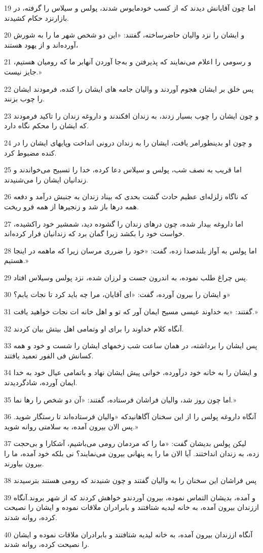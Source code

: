 \par 19 اما چون آقایانش دیدند که از کسب خودمایوس شدند، پولس و سیلاس را گرفته، در بازارنزد حکام کشیدند.
\par 20 و ایشان را نزد والیان حاضرساخته، گفتند: «این دو شخص شهر ما را به شورش آورده‌اند و از یهود هستند،
\par 21 و رسومی را اعلام می‌نمایند که پذیرفتن و به‌جا آوردن آنهابر ما که رومیان هستیم، جایز نیست.»
\par 22 پس خلق بر ایشان هجوم آوردند و والیان جامه های ایشان را کنده، فرمودند ایشان را چوب بزنند.
\par 23 و چون ایشان را چوب بسیار زدند، به زندان افکندند و داروغه زندان را تاکید فرمودند که ایشان را محکم نگاه دارد.
\par 24 و چون او بدینطورامر یافت، ایشان را به زندان درونی انداخت وپایهای ایشان را در کنده مضبوط کرد.
\par 25 اما قریب به نصف شب، پولس و سیلاس دعا کرده، خدا را تسبیح می‌خواندند و زندانیان ایشان را می‌شنیدند.
\par 26 که ناگاه زلزله‌ای عظیم حادث گشت بحدی که بیناد زندان به جنبش درآمد و دفعه همه درها باز شد و زنجیرها از همه فرو ریخت.
\par 27 اما داروغه بیدار شده، چون درهای زندان را گشوده دید، شمشیر خود راکشیده، خواست خود را بکشد زیرا گمان برد که زندانیان فرار کرده‌اند.
\par 28 اما پولس به آواز بلندصدا زده، گفت: «خود را ضرری مرسان زیرا که ماهمه در اینجا هستیم.»
\par 29 پس چراغ طلب نموده، به اندرون جست و لرزان شده، نزد پولس وسیلاس افتاد.
\par 30 و ایشان را بیرون آورده، گفت: «ای آقایان، مرا چه باید کرد تا نجات یابم؟»
\par 31 گفتند: «به خداوند عیسی مسیح ایمان آور که تو و اهل خانه ات نجات خواهید یافت.»
\par 32 آنگاه کلام خداوند را برای او وتمامی اهل بیتش بیان کردند.
\par 33 پس ایشان را برداشته، در همان ساعت شب زخمهای ایشان را شست و خود و همه کسانش فی الفور تعمید یافتند.
\par 34 و ایشان را به خانه خود درآورده، خوانی پیش ایشان نهاد و باتمامی عیال خود به خدا ایمان آورده، شادگردیدند.
\par 35 اما چون روز شد، والیان فراشان فرستاده، گفتند: «آن دو شخص را رها نما.»
\par 36 آنگاه داروغه پولس را از این سخنان آگاهانیدکه «والیان فرستاده‌اند تا رستگار شوید. پس الان بیرون آمده، به سلامتی روانه شوید.»
\par 37 لیکن پولس بدیشان گفت: «ما را که مردمان رومی می‌باشیم، آشکارا و بی‌حجت زده، به زندان انداختند. آیا الان ما را به پنهانی بیرون می‌نمایند؟ نی بلکه خود آمده، ما را بیرون بیاورند.
\par 38 پس فراشان این سخنان را به والیان گفتند و چون شنیدند که رومی هستند بترسیدند
\par 39 و آمده، بدیشان التماس نموده، بیرون آوردندو خواهش کردند که از شهر بروند.آنگاه اززندان بیرون آمده، به خانه لیدیه شتافتند و بابرادران ملاقات نموده و ایشان را نصیحت کرده، روانه شدند.
\par 40 آنگاه اززندان بیرون آمده، به خانه لیدیه شتافتند و بابرادران ملاقات نموده و ایشان را نصیحت کرده، روانه شدند.

